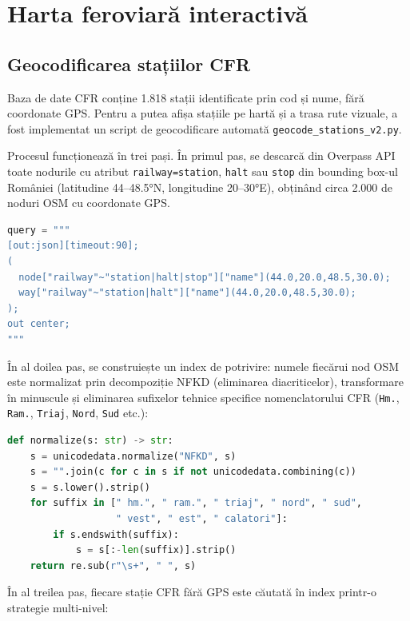 \documentclass[12pt,a4paper]{report}
\begin{document}
\section{Harta feroviară interactivă}

\subsection{Geocodificarea stațiilor CFR}

Baza de date CFR conține 1.818 stații identificate prin cod și nume, fără coordonate GPS. Pentru a putea afișa stațiile pe hartă și a trasa rute vizuale, a fost implementat un script de geocodificare automată \texttt{geocode\_stations\_v2.py}.

Procesul funcționează în trei pași. În primul pas, se descarcă din Overpass API toate nodurile cu atribut \texttt{railway=station}, \texttt{halt} sau \texttt{stop} din bounding box-ul României (latitudine 44--48.5°N, longitudine 20--30°E), obținând circa 2.000 de noduri OSM cu coordonate GPS.

\begin{lstlisting}[language=Python, caption=Interogare Overpass API pentru statii feroviare din Romania]
query = """
[out:json][timeout:90];
(
  node["railway"~"station|halt|stop"]["name"](44.0,20.0,48.5,30.0);
  way["railway"~"station|halt"]["name"](44.0,20.0,48.5,30.0);
);
out center;
"""
\end{lstlisting}

În al doilea pas, se construiește un index de potrivire: numele fiecărui nod OSM este normalizat prin decompoziție NFKD (eliminarea diacriticelor), transformare în minuscule și eliminarea sufixelor tehnice specifice nomenclatorului CFR (\texttt{Hm.}, \texttt{Ram.}, \texttt{Triaj}, \texttt{Nord}, \texttt{Sud} etc.):

\begin{lstlisting}[language=Python, caption=Normalizarea numelor pentru potrivire CFR-OSM]
def normalize(s: str) -> str:
    s = unicodedata.normalize("NFKD", s)
    s = "".join(c for c in s if not unicodedata.combining(c))
    s = s.lower().strip()
    for suffix in [" hm.", " ram.", " triaj", " nord", " sud",
                   " vest", " est", " calatori"]:
        if s.endswith(suffix):
            s = s[:-len(suffix)].strip()
    return re.sub(r"\s+", " ", s)
\end{lstlisting}

În al treilea pas, fiecare stație CFR fără GPS este căutată în index printr-o strategie multi-nivel:
\end{document}
